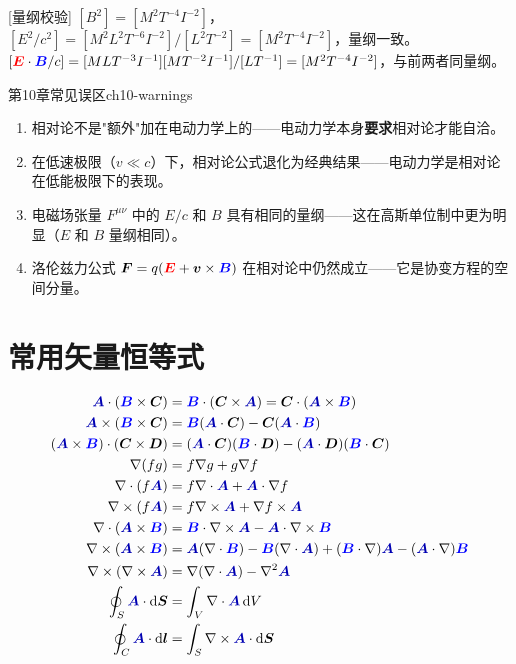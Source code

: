 \documentclass[11pt,a4paper,openany,oneside]{book}
\newcommand{\diff}{\mathrm{d}}
\newcommand{\vecE}{\textcolor{red}{\vect{E}}}
\newcommand{\vecB}{\textcolor{blue}{\vect{B}}}
\newcommand{\vecA}{\textcolor{blue!70!black}{\vect{A}}}
\newcommand{\vect}[1]{\bm{#1}}
\newcommand{\grad}{\nabla}
\newcommand{\curl}{\nabla\times}
\newcommand{\divg}{\nabla\cdot}
\newcommand{\lap}{\nabla^2}
\begin{document}
[量纲校验] $[B^2] = [M^2T^{-4}I^{-2}]$，$[E^2/c^2] = [M^2L^2T^{-6}I^{-2}]/[L^2T^{-2}] = [M^2T^{-4}I^{-2}]$，量纲一致。$[\vecE\cdot\vecB/c] = [MLT^{-3}I^{-1}][MT^{-2}I^{-1}]/[LT^{-1}] = [M^2T^{-4}I^{-2}]$，与前两者同量纲。\qedsymbol



\begin{warning}{第10章常见误区}{ch10-warnings}
\begin{enumerate}
\item 相对论不是"额外"加在电动力学上的——电动力学本身\textbf{要求}相对论才能自洽。
\item 在低速极限（$v \ll c$）下，相对论公式退化为经典结果——电动力学是相对论在低能极限下的表现。
\item 电磁场张量 $F^{\mu\nu}$ 中的 $E/c$ 和 $B$ 具有相同的量纲——这在高斯单位制中更为明显（$E$ 和 $B$ 量纲相同）。
\item 洛伦兹力公式 $\vect{F} = q(\vecE + \vect{v}\times\vecB)$ 在相对论中仍然成立——它是协变方程的空间分量。
\end{enumerate}
\end{warning}

\appendix

\chapter{常用矢量恒等式}

\begin{align}
\vecA \cdot (\vecB \times \vect{C}) &= \vecB \cdot (\vect{C} \times \vecA) = \vect{C} \cdot (\vecA \times \vecB) \\
\vecA \times (\vecB \times \vect{C}) &= \vecB(\vecA\cdot\vect{C}) - \vect{C}(\vecA\cdot\vecB) \\
(\vecA \times \vecB) \cdot (\vect{C} \times \vect{D}) &= (\vecA\cdot\vect{C})(\vecB\cdot\vect{D}) - (\vecA\cdot\vect{D})(\vecB\cdot\vect{C}) \\
\grad(fg) &= f\grad g + g\grad f \\
\divg(f\vecA) &= f\divg\vecA + \vecA\cdot\grad f \\
\curl(f\vecA) &= f\curl\vecA + \grad f \times \vecA \\
\divg(\vecA \times \vecB) &= \vecB\cdot\curl\vecA - \vecA\cdot\curl\vecB \\
\curl(\vecA \times \vecB) &= \vecA(\divg\vecB) - \vecB(\divg\vecA) + (\vecB\cdot\grad)\vecA - (\vecA\cdot\grad)\vecB \\
\curl(\curl\vecA) &= \grad(\divg\vecA) - \lap\vecA \\
\oint_S \vecA\cdot\diff\vect{S} &= \int_V \divg\vecA\,\diff V \\
\oint_C \vecA\cdot\diff\vect{l} &= \int_S \curl\vecA\cdot\diff\vect{S}
\end{align}
\end{document}
